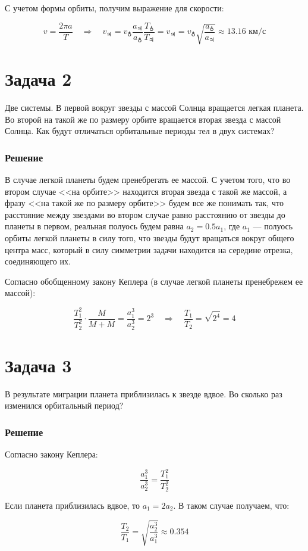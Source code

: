 \documentclass[a4paper, 12pt]{article}
\newcommand{\RN}[1]
{\MakeUppercase{\romannumeral #1}} %
\newcommand{\qrq}
{\ensuremath{\quad \Rightarrow \quad}} %
\begin{document}
С учетом формы орбиты, получим выражение для скорости:

\begin{equation}
	v = \frac{2 \pi a}{T} \qrq v_{\jupiter} = v_{\earth} \frac{a_{\jupiter}}{a_{\earth}} \frac{T_{\earth}}{T_{\jupiter}} = \boxed{v_{\jupiter} = v_{\earth} \sqrt{\frac{a_{\earth}}{a_{\jupiter}}} \approx 13.16 \text{ км/с}}
\end{equation}

\section*{Задача 2}

Две системы. В первой вокруг звезды с массой Солнца вращается легкая планета. Во второй на такой же по размеру орбите вращается вторая звезда с массой Солнца. Как будут отличаться орбитальные периоды тел в двух системах?

\subsubsection*{Решение}

В случае легкой планеты будем пренебрегать ее массой. С учетом того, что во втором случае <<на орбите>> находится вторая звезда с такой же массой, а фразу <<на такой же по размеру орбите>> будем все же понимать так, что расстояние между звездами во втором случае равно расстоянию от звезды до планеты в первом, реальная полуось будем равна $a_2 = 0.5 a_1$, где $a_1$ --- полуось орбиты легкой планеты в силу того, что звезды будут вращаться вокруг общего центра масс, который в силу симметрии задачи находится на середине отрезка, соединяющего их.

Согласно обобщенному закону Кеплера (в случае легкой планеты пренебрежем ее массой):

\begin{equation}
	\frac{T_1^2}{T_2^2} \cdot \frac{M}{M + M} = \frac{a_1^3}{a_2^3} = 2^3 \qrq \boxed{\frac{T_1}{T_2} = \sqrt{2^4} = 4}
\end{equation}

\section*{Задача 3} 

В результате миграции планета приблизилась к звезде вдвое. Во сколько раз изменился орбитальный период?

\subsubsection*{Решение}

Согласно \RN{3} закону Кеплера:

\begin{equation}
	\frac{a_1^3}{a_2^3} = \frac{T_1^2}{T_2^2}
\end{equation}

Если планета приблизилась вдвое, то $a_1 = 2 a_2$. В таком случае получаем, что:

\begin{equation}
	\boxed{\frac{T_2}{T_1} = \sqrt{\frac{a_2^3}{a_1^3}} \approx 0.354}
\end{equation}
\end{document}
